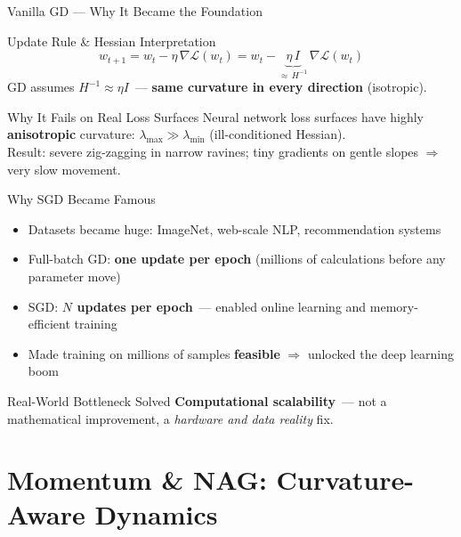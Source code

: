 \documentclass{beamer}
\begin{document}
\begin{frame}[shrink=10]{Vanilla GD --- Why It Became the Foundation}
  \begin{block}{Update Rule \& Hessian Interpretation}
    \[
      w_{t+1} = w_t - \eta\,\nabla\mathcal{L}(w_t)
              = w_t - \underbrace{\eta\,I}_{\approx\,H^{-1}}\,
                \nabla\mathcal{L}(w_t)
    \]
    GD assumes $H^{-1} \approx \eta I$~---
    \textbf{same curvature in every direction} (isotropic).
  \end{block}

  \medskip

  \begin{alertblock}{Why It Fails on Real Loss Surfaces}
    Neural network loss surfaces have highly \textbf{anisotropic}
    curvature: $\lambda_{\max} \gg \lambda_{\min}$
    (ill-conditioned Hessian).\\[4pt]
    Result: severe zig-zagging in narrow ravines;
    tiny gradients on gentle slopes $\Rightarrow$ very slow movement.
  \end{alertblock}

  \medskip

  \begin{block}{Why SGD Became Famous}
    \begin{itemize}\setlength\itemsep{5pt}
      \item Datasets became huge: ImageNet, web-scale NLP,
            recommendation systems
      \item Full-batch GD: \textbf{one update per epoch}
            (millions of calculations before any parameter move)
      \item SGD: \textbf{$N$ updates per epoch}~--- enabled
            online learning and memory-efficient training
      \item Made training on millions of samples \textbf{feasible}
            $\Rightarrow$ unlocked the deep learning boom
    \end{itemize}
  \end{block}

  \begin{exampleblock}{Real-World Bottleneck Solved}
    \textbf{Computational scalability}~--- not a mathematical
    improvement, a \emph{hardware and data reality} fix.
  \end{exampleblock}
\end{frame}

\section{Momentum \& NAG: Curvature-Aware Dynamics}
\end{document}
